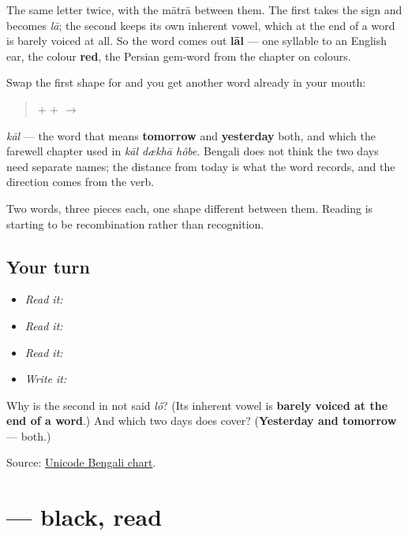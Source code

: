 The same letter twice, with the mātrā between them. The first \textbf{} takes the sign and becomes \emph{lā}; the second keeps its own inherent vowel, which at the end of a word is barely voiced at all. So the word comes out \textbf{lāl} — one syllable to an English ear, the colour \textbf{red}, the Persian gem-word from the chapter on colours.

Swap the first shape for \textbf{} and you get another word already in your mouth:

\begin{quote}
\textbf{} + \textbf{} + \textbf{} $\to$ \textbf{}
\end{quote}

\emph{kāl} — the word that means \textbf{tomorrow} and \textbf{yesterday} both, and which the farewell chapter used in \emph{kāl dækhā hôbe}. Bengali does not think the two days need separate names; the distance from today is what the word records, and the direction comes from the verb.

Two words, three pieces each, one shape different between them. Reading is starting to be recombination rather than recognition.

\subsection*{Your turn}
\begin{itemize}
\raggedright
  \item \emph{Read it:} 
  \item \emph{Read it:} 
  \item \emph{Read it:} 
  \item \emph{Write it:} 
\end{itemize}

\begin{tcolorbox}[breakable,colback=teal!4,colframe=teal!35!black,title={Before you move on}]
Why is the second \textbf{} in \textbf{} not said \emph{lô}? (Its inherent vowel is \textbf{barely voiced at the end of a word}.) And which two days does \textbf{} cover? (\textbf{Yesterday and tomorrow} — both.)

Source: \href{https://www.unicode.org/charts/PDF/U0980.pdf}{Unicode Bengali chart}.
\end{tcolorbox}
\section[kālo]{ — black, read}

